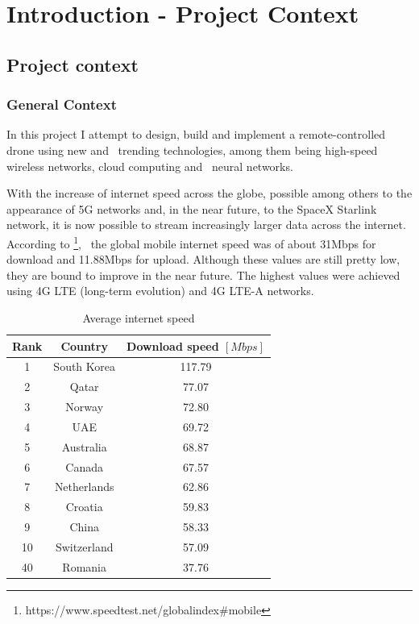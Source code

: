 
\chapter{Introduction - Project Context}
\label{ch:introduction}
\pagestyle{headings}

\section{Project context}
\label{sec:introduction-context}

\subsection{General Context}
\label{subsec:introduction-general-context}
In this project I attempt to design, build and implement a remote-controlled drone using new and \
trending technologies, among them being high-speed wireless networks, cloud computing and \
neural networks.

With the increase of internet speed across the globe, possible among others to the appearance of 5G networks and, in
the near future, to the SpaceX Starlink network, it is now possible to stream increasingly larger data across the
internet.
According to \footnote{https://www.speedtest.net/global\-index\#mobile}, \
the global mobile internet speed was of about 31Mbps for download and 11.88Mbps for upload.
Although these values are still pretty low, they are bound to improve in the near future.
The highest values were achieved using 4G LTE (long-term evolution) and 4G LTE-A networks.

\begin{table}[ht]
    \caption{Average internet speed}
    \centering
    \begin{tabular}{|c|c|c|}
        \hline\hline
        Rank & Country & Download speed $[Mbps]$ \\
        \hline
        1 & South Korea & 117.79 \\
        2 & Qatar & 77.07  \\
        3 & Norway & 72.80 \\
        4 & UAE & 69.72 \\
        5 & Australia & 68.87 \\
        6 & Canada & 67.57 \\
        7 & Netherlands & 62.86 \\
        8 & Croatia & 59.83 \\
        9 & China & 58.33 \\
        10 & Switzerland & 57.09 \\
        40 & Romania & 37.76
        \hline
    \end{tabular}
    \label{tab:internetspeed}
\end{table}


